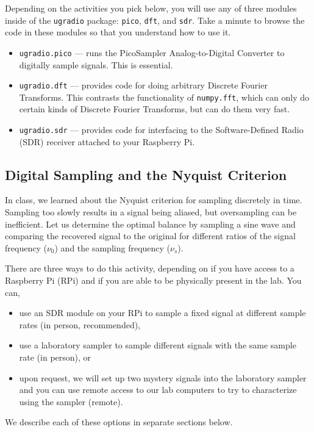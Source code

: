 \documentclass[11pt,preprint]{aastex}
\begin{document}
Depending on the activities you pick below, you will use any of three modules 
inside of the {\tt ugradio} package:
{\tt pico}, {\tt dft}, and {\tt sdr}.
Take a minute to browse the code in these modules so that you understand how to use it.

\begin{itemize}

\item {\tt ugradio.pico} --- runs the PicoSampler Analog-to-Digital Converter to digitally sample signals. This is essential.

\item {\tt ugradio.dft} --- provides code for doing arbitrary Discrete Fourier Transforms.  This
contrasts the functionality of {\tt numpy.fft}, which can only do certain kinds of
Discrete Fourier Transforms, but can do them very fast.

\item {\tt ugradio.sdr} --- provides code for interfacing to the Software-Defined
Radio (SDR) receiver attached to your Raspberry Pi.



\end{itemize}


\subsection{Digital Sampling and the Nyquist Criterion}

\noindent
%
In class, we learned about the 
Nyquist criterion for sampling discretely in time. 
Sampling too slowly results in a signal being aliased, but oversampling
can be inefficient.
Let us determine the optimal balance by sampling a sine wave
and comparing the recovered signal
to the original for different ratios of the signal frequency ($\nu_0$) and the
sampling frequency ($\nu_s$).

There are three ways to do this activity, depending on if you have access to a
Raspberry Pi (RPi) and if you are able to be physically present in the lab. You can,
\begin{itemize}
\item use an SDR module on your RPi to sample a fixed signal at different sample
rates (in person, recommended),
\item use a laboratory sampler to sample different signals with the same sample rate
(in person), or
\item upon request, we will set up two mystery signals into the laboratory sampler and you can use remote access to our lab computers to try to characterize using the sampler (remote).
\end{itemize}
\noindent
We describe each of these options in separate sections below.
\end{document}
